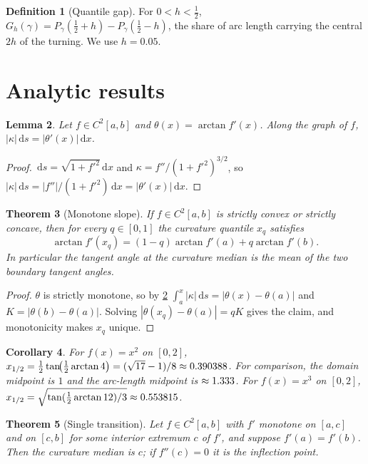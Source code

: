 \documentclass[11pt]{amsart}
\newtheorem{theorem}{Theorem}
\newtheorem{lemma}[theorem]{Lemma}
\newtheorem{corollary}[theorem]{Corollary}
\theoremstyle{definition}
\newtheorem{definition}[theorem]{Definition}
\theoremstyle{remark}
\newcommand{\dd}{\,\mathrm{d}}
\begin{document}
\begin{definition}[Quantile gap]
For $0<h<\tfrac12$, $G_h(\gamma)=P_\gamma(\tfrac12+h)-P_\gamma(\tfrac12-h)$, the share of arc length carrying the central $2h$ of the turning. We use $h=0.05$.
\end{definition}

\section{Analytic results}\label{sec:theory}

\begin{lemma}\label{lem:angle}
Let $f\in C^2[a,b]$ and $\theta(x)=\arctan f'(x)$. Along the graph of $f$, $|\kappa|\dd s=|\theta'(x)|\dd x$.
\end{lemma}

\begin{proof}
$\dd s=\sqrt{1+f'^2}\dd x$ and $\kappa=f''/(1+f'^2)^{3/2}$, so $|\kappa|\dd s=|f''|/(1+f'^2)\dd x=|\theta'(x)|\dd x$.
\end{proof}

\begin{theorem}[Monotone slope]\label{thm:monotone}
If $f\in C^2[a,b]$ is strictly convex or strictly concave, then for every $q\in[0,1]$ the curvature quantile $x_q$ satisfies
\[
\arctan f'(x_q)=(1-q)\arctan f'(a)+q\arctan f'(b).
\]
In particular the tangent angle at the curvature median is the mean of the two boundary tangent angles.
\end{theorem}

\begin{proof}
$\theta$ is strictly monotone, so by \cref{lem:angle} $\int_a^x|\kappa|\dd s=|\theta(x)-\theta(a)|$ and $K=|\theta(b)-\theta(a)|$. Solving $|\theta(x_q)-\theta(a)|=qK$ gives the claim, and monotonicity makes $x_q$ unique.
\end{proof}

\begin{corollary}\label{cor:closed}
For $f(x)=x^2$ on $[0,2]$, $x_{1/2}=\tfrac12\tan\!\bigl(\tfrac12\arctan4\bigr)=(\sqrt{17}-1)/8\approx0.390388$. For comparison, the domain midpoint is $1$ and the arc-length midpoint is $\approx1.333$. For $f(x)=x^3$ on $[0,2]$, $x_{1/2}=\sqrt{\tan(\tfrac12\arctan12)/3}\approx0.553815$.
\end{corollary}

\begin{theorem}[Single transition]\label{thm:sigmoid}
Let $f\in C^2[a,b]$ with $f'$ monotone on $[a,c]$ and on $[c,b]$ for some interior extremum $c$ of $f'$, and suppose $f'(a)=f'(b)$. Then the curvature median is $c$; if $f''(c)=0$ it is the inflection point.
\end{theorem}
\end{document}
